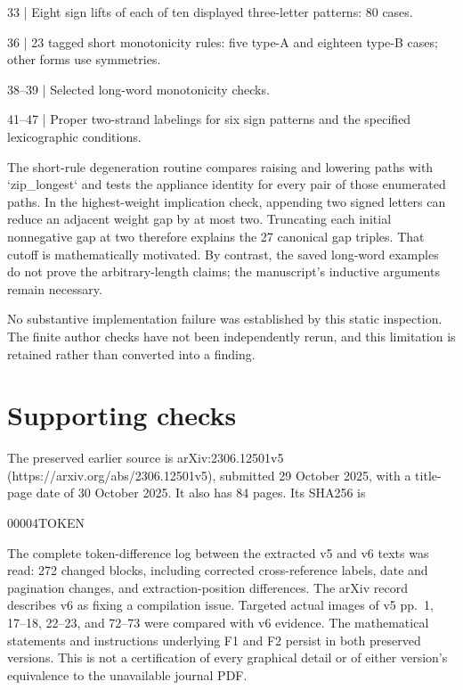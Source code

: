 \documentclass[10pt]{article}
\begin{document}
33 | Eight sign lifts of each of ten displayed three-letter patterns: 80 cases.\par
36 | 23 tagged short monotonicity rules: five type-A and eighteen type-B cases; other forms use symmetries.\par
38–39 | Selected long-word monotonicity checks.\par
41–47 | Proper two-strand labelings for six sign patterns and the specified lexicographic conditions.\par
The short-rule degeneration routine compares raising and lowering paths with `zip\_longest` and tests the appliance identity for every pair of those enumerated paths. In the highest-weight implication check, appending two signed letters can reduce an adjacent weight gap by at most two. Truncating each initial nonnegative gap at two therefore explains the 27 canonical gap triples. That cutoff is mathematically motivated. By contrast, the saved long-word examples do not prove the arbitrary-length claims; the manuscript’s inductive arguments remain necessary.\par
No substantive implementation failure was established by this static inspection. The finite author checks have not been independently rerun, and this limitation is retained rather than converted into a finding.\par
\section*{Supporting checks}
The preserved earlier source is arXiv:2306.12501v5 (https://arxiv.org/abs/2306.12501v5), submitted 29 October 2025, with a title-page date of 30 October 2025. It also has 84 pages. Its SHA256 is\par
00004TOKEN\par
The complete token-difference log between the extracted v5 and v6 texts was read: 272 changed blocks, including corrected cross-reference labels, date and pagination changes, and extraction-position differences. The arXiv record describes v6 as fixing a compilation issue. Targeted actual images of v5 pp. 1, 17–18, 22–23, and 72–73 were compared with v6 evidence. The mathematical statements and instructions underlying F1 and F2 persist in both preserved versions. This is not a certification of every graphical detail or of either version’s equivalence to the unavailable journal PDF.\par
\end{document}
